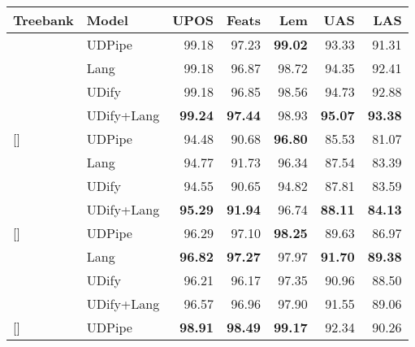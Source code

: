 \documentclass[11pt,a4paper]{article}
\begin{document}
\begin{table}[!t]
    \fontsize{8}{10}\selectfont
    \begin{center}
    \setlength{\tabcolsep}{2pt}
    \begin{tabularx}{\linewidth}{@{}Xlrrrrr@{}}
    \toprule
        \sc Treebank & \sc Model & \sc UPOS & \sc Feats & \sc Lem & \sc UAS & \sc LAS \\
    \midrule
    [\normalbaselineskip]{}
        & UDPipe     &      99.18 &      97.23 &  \bf 99.02 &      93.33 &      91.31 \\
    \addlinespace[2pt]
        & Lang       &      99.18 &      96.87 &      98.72 &      94.35 &      92.41 \\
        & UDify      &      99.18 &      96.85 &      98.56 &      94.73 &      92.88 \\
        & UDify+Lang &  \bf 99.24 &  \bf 97.44 &      98.93 &  \bf 95.07 &  \bf 93.38 \\
    \addlinespace[5pt]
    [\normalbaselineskip]{}
        & UDPipe     &      94.48 &      90.68 &  \bf 96.80 &      85.53 &      81.07 \\
        & Lang       &      94.77 &      91.73 &      96.34 &      87.54 &      83.39 \\
        & UDify      &      94.55 &      90.65 &      94.82 &      87.81 &      83.59 \\
        & UDify+Lang &  \bf 95.29 &  \bf 91.94 &      96.74 &  \bf 88.11 &  \bf 84.13 \\
    \addlinespace[5pt]
    [\normalbaselineskip]{}
        & UDPipe     &      96.29 &      97.10 &  \bf 98.25 &      89.63 &      86.97 \\
    \addlinespace[2pt]
        & Lang       &  \bf 96.82 &  \bf 97.27 &      97.97 &  \bf 91.70 &  \bf 89.38 \\
        & UDify      &      96.21 &      96.17 &      97.35 &      90.96 &      88.50 \\
        & UDify+Lang &      96.57 &      96.96 &      97.90 &      91.55 &      89.06 \\
    \addlinespace[5pt]
    [\normalbaselineskip]{}
        & UDPipe     &  \bf 98.91 &  \bf 98.49 &  \bf 99.17 &      92.34 &      90.26 \\

\end{tabularx}
\end{center}
\end{table}
\end{document}
